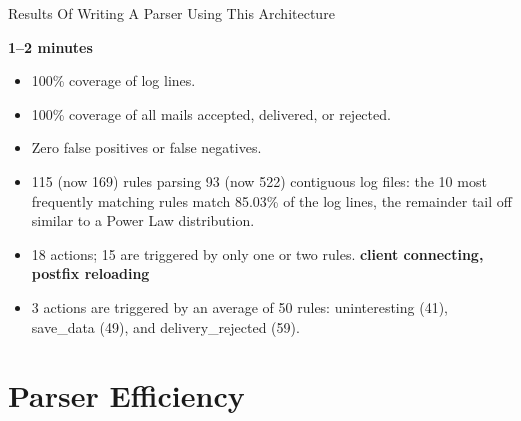 \documentclass{beamer}
\newcommand{\timingnote}[1]{%
    \textbf{#1}%
}
\begin{document}
\begin{frame}{Results Of Writing A Parser Using This Architecture}

    \timingnote{1--2 minutes}

    \begin{itemize}

        \item 100\% coverage of log lines.

        \item 100\% coverage of all mails accepted, delivered, or rejected.

        \item Zero false positives or false negatives.

        \item 115 (now 169) rules parsing 93 (now 522) contiguous log
            files: the 10 most frequently matching rules match 85.03\% of
            the log lines, the remainder tail off similar to a Power Law
            distribution.

        \item 18 actions; 15 are triggered by only one or two rules.
            \timingnote{client connecting, postfix reloading}

        \item 3 actions are triggered by an average of 50 rules:
            uninteresting (41), save\_data (49), and delivery\_rejected
            (59).

    \end{itemize}

\end{frame}

\section{Parser Efficiency}
\end{document}
